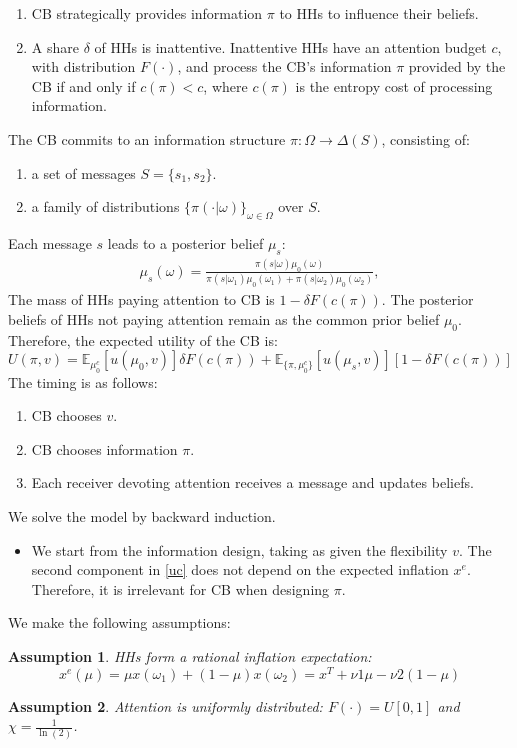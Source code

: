 \documentclass{beamer}
\newtheorem{assumption}{Assumption}
\begin{document}
\begin{frame}[allowframebreaks]
\begin{enumerate}
    \item CB strategically provides information $\pi$ to HHs to influence their beliefs.
    \item A share $\delta$ of HHs is inattentive. Inattentive HHs have an attention budget $c$, with distribution $F(\cdot)$, and process the CB's information $\pi$ provided by the CB if and only if $c(\pi)<c$, where $c(\pi)$ is the entropy cost of processing information. 
\end{enumerate}
\framebreak
The CB commits to an information structure $\pi: \Omega \to \Delta(S)$, consisting of:
\begin{enumerate}
    \item a set of messages $S=\{s_1,s_2\}$.
    \item a family of distributions $\{\pi(\cdot|\omega)\}_{\omega\in\Omega}$ over $S$.
\end{enumerate}
\vskip10pt
Each message $s$ leads to a posterior belief $\mu_s$:
\begin{align*}
    \mu_s(\omega) = \frac{\pi(s|\omega)\mu_0(\omega)}{\pi(s|\omega_1)\mu_0(\omega_1)+\pi(s|\omega_2)\mu_0(\omega_2)},
\end{align*}
\vskip5pt 
\framebreak
The mass of HHs paying attention to CB is $1-\delta F(c(\pi))$. 
\vskip5pt 
The posterior beliefs of HHs not paying attention remain as the common prior belief $\mu_0$. 
\vskip5pt 
Therefore, the expected utility of the CB is:
\begin{equation}
\label{expected_uc}
U(\pi,v)=\mathbb{E}_{\mu_0^c}[u(\mu_0,v)]\delta F(c(\pi)) + \mathbb{E}_{\{\pi,\mu_0^c\}}[u(\mu_s,v)][1-\delta F(c(\pi))]
\end{equation}
The timing is as follows:
\begin{enumerate}
    \item CB chooses $v$.
    \item CB chooses information $\pi$.
    \item Each receiver devoting attention receives a message and updates beliefs.
\end{enumerate}
\vskip5pt
\framebreak
We solve the model by backward induction.
\begin{itemize}
    \item We start from the information design, taking as given the flexibility $v$. The second component in \eqref{uc} does not depend on the expected inflation $x^e$. Therefore, it is irrelevant for CB when designing $\pi$.
\end{itemize}
\vskip5pt
We make the following assumptions:
\begin{assumption}
    \label{Ass1}
    HHs form a rational inflation expectation:
    \begin{equation}
    \label{expectedinflation}
    x^e(\mu)=\mu x(\omega_1)+(1-\mu)x(\omega_2)=x^T+\nu1\mu-\nu2(1-\mu)
    \end{equation}
\end{assumption}
\begin{assumption}
\label{Ass2}
    Attention is uniformly distributed: $F(\cdot)=U[0,1]$ and $\chi=\frac{1}{\ln(2)}$.
\end{assumption}
\end{frame}
\end{document}
